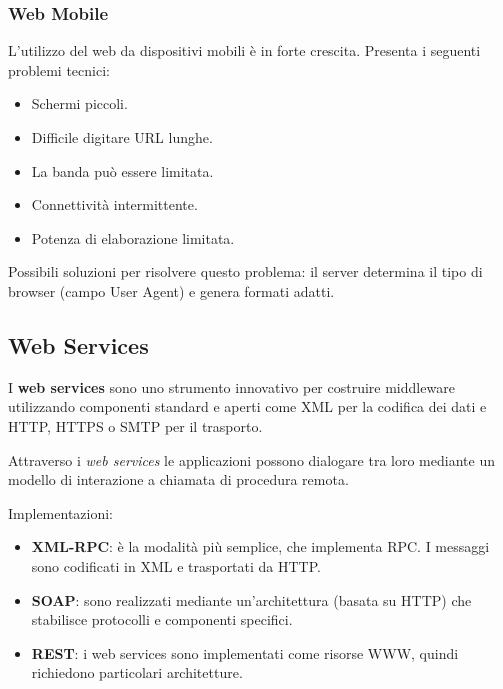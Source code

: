         \subsubsection{Web Mobile}
            L'utilizzo del web da dispositivi mobili è in forte crescita. Presenta i seguenti problemi tecnici:
            \begin{itemize}
                \item Schermi piccoli.
                \item Difficile digitare URL lunghe.
                \item La banda può essere limitata.
                \item Connettività intermittente.
                \item Potenza di elaborazione limitata.
            \end{itemize}

            Possibili soluzioni per risolvere questo problema: il server determina il tipo di browser (campo User Agent) e genera formati adatti.

    \subsection{Web Services}
        I \textbf{web services} sono uno strumento innovativo per costruire middleware utilizzando componenti standard e aperti come XML per la codifica dei dati e HTTP, HTTPS o SMTP per il trasporto.

        Attraverso i \textit{web services} le applicazioni possono dialogare tra loro mediante un modello di interazione a chiamata di procedura remota.
    
        Implementazioni:
        \begin{itemize}
            \item \textbf{XML-RPC}: è la modalità più semplice, che implementa RPC. I messaggi sono codificati in XML e trasportati da HTTP.
            \item \textbf{SOAP}: sono realizzati mediante un'architettura (basata su HTTP) che stabilisce protocolli e componenti specifici.
            \item \textbf{REST}: i web services sono implementati come risorse WWW, quindi richiedono particolari architetture.
        \end{itemize}

